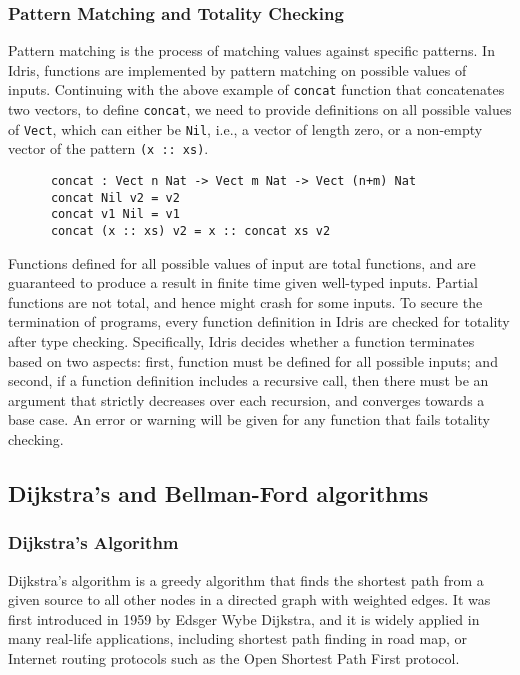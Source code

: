 \subsubsection*{Pattern Matching and Totality Checking}
Pattern matching is the process of matching values against specific patterns. In Idris, functions are implemented by pattern matching on possible values of inputs. Continuing with the above example of \texttt{concat} function that concatenates two vectors, to define \texttt{concat}, we need to provide definitions on all possible values of \texttt{Vect}, which can either be \texttt{Nil}, i.e., a vector of length zero, or a non-empty vector of the pattern \texttt{(x :: xs)}. 
\begin{lstlisting}
      concat : Vect n Nat -> Vect m Nat -> Vect (n+m) Nat
      concat Nil v2 = v2
      concat v1 Nil = v1
      concat (x :: xs) v2 = x :: concat xs v2
\end{lstlisting}

Functions defined for all possible values of input are total functions, and are guaranteed to produce a result in finite time given well-typed inputs. Partial functions are not total, and hence might crash for some inputs. To secure the termination of programs, every function definition in Idris are checked for totality after type checking. Specifically, Idris decides whether a function terminates based on two aspects: first, function must be defined for all possible inputs; and second, if a function definition includes a recursive call, then there must be an argument that strictly decreases over each recursion, and converges towards a base case. An error or warning will be given for any function that fails totality checking. 

\subsection{Dijkstra's and Bellman-Ford algorithms}
\subsubsection*{Dijkstra's Algorithm}
Dijkstra's algorithm is a greedy algorithm that finds the shortest path from a given source to all other nodes in a directed graph with weighted edges. It was first introduced in 1959 by Edsger Wybe Dijkstra, and it is widely applied in many real-life applications, including shortest path finding in road map, or Internet routing protocols such as the Open Shortest Path First protocol. 
\\

